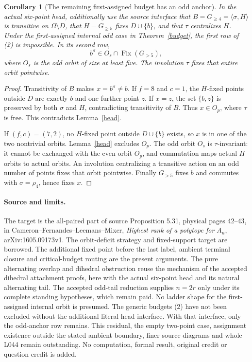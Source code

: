 \documentclass[11pt,a4paper]{article}
\newtheorem{corollary}[lemma]{Corollary}
\newcommand{\gen}[1]{\langle#1\rangle}
\begin{document}
\begin{corollary}[The remaining first-assigned budget has an odd anchor]
In the actual six-point head, additionally use the source interface
that $B=G_{\ge4}=\gen{\sigma,H}$ is transitive on
$\Omega\setminus D$, that $H=G_{\ge5}$ fixes $D\cup\{b\}$,
and that $\tau$ centralizes $H$. Under the first-assigned internal
odd case in Theorem~\ref{budget}, the first row of (2) is impossible.
In its second row,
\[
             b^\sigma\in O_s\cap\operatorname{Fix}(G_{>5}),
\]
where $O_s$ is the odd orbit of size at least five. The involution
$\tau$ fixes that entire orbit pointwise.
\end{corollary}
\begin{proof}
Transitivity of $B$ makes $x=b^\sigma\ne b$.
If $f=8$ and $c=1$, the $H$-fixed points outside $D$ are exactly
$b$ and one further point $z$. If $x=z$, the set $\{b,z\}$ is
preserved by both $\sigma$ and $H$, contradicting transitivity
of $B$. Thus $x\in O_p$, where $\tau$ is free. This contradicts
Lemma~\ref{head}.

If $(f,c)=(7,2)$, no $H$-fixed point outside $D\cup\{b\}$
exists, so $x$ is in one of the two nontrivial orbits.
Lemma~\ref{head} excludes $O_p$. The odd orbit $O_s$ is
$\tau$-invariant: it cannot be exchanged with the even orbit
$O_p$, and commutation maps actual $H$-orbits to actual orbits.
An involution centralizing a transitive action on an odd number
of points fixes that orbit pointwise. Finally $G_{>5}$ fixes
$b$ and commutes with $\sigma=\rho_4$, hence fixes $x$.
\end{proof}

\paragraph{Source and limits.}
The target is the all-paired part of source Proposition 5.31,
physical pages 42--43, in Cameron--Fernandes--Leemans--Mixer,
\emph{Highest rank of a polytope for $A_n$}, arXiv:1605.09173v1.
The orbit-deficit strategy and fixed-support target are borrowed.
The additional fixed point before the last label, ambient terminal
closure and critical-budget routing are the present arguments.
The pure alternating overlap and dihedral obstruction reuse the
mechanism of the accepted dihedral attachment proofs, here with the
actual six-point head and its natural alternating tail.
The accepted odd-tail reduction supplies $n=2r$ only under its
complete standing hypotheses, which remain paid. No ladder shape
for the first-assigned internal orbit is presumed.
The generic budgets (2) have not been excluded without the
additional literal head interface. With that interface, only the
odd-anchor row remains. This residual, the empty two-point case,
assignment existence outside the stated ambient boundary, finer
source diagrams and whole L044 remain outstanding. No computation, formal result,
original credit or question credit is added.
\end{document}
